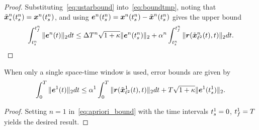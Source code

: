\begin{proof}
Substituting~\eqref{eq:ustarbound} into~\eqref{eq:boundtmp}, noting that $\tilde{\boldsymbol x}_{*}^{n}(t_s^{n})=  {\boldsymbol x}^{n}(t_s^{n})$,  and using $\boldsymbol e^{n}(t_s^{n}) =  {\boldsymbol x}^{n}(t_s^{n} ) -  \tilde{\boldsymbol x}^{n}(t_s^{n})$ gives the upper bound
\begin{equation*}
\int_{t_s^{n}}^{t_f^{n}} \| \boldsymbol e^{n}(t) \|_2 dt \le \Delta T^{n} \sqrt{1 + \kappa} \|  \boldsymbol e^{n}(t_s^{n})   \|_2   + \alpha^{n} \int_{t_s^{n}}^{t_f^{n}} \|  \boldsymbol r(\tilde{\boldsymbol x}_{\ell^2}^{n}(t),t)  \|_2 dt.
\end{equation*}
\end{proof}

\begin{corollary}
When only a single space-time window is used, error bounds are given by
\begin{equation*}
\int_0^T \| \boldsymbol e^{1}(t) \|_2 dt \le \alpha^{1} \int_0^T \| \boldsymbol r(\tilde{\boldsymbol x}_{\ell^2}^{1}(t),t) \|_2dt +
 T \sqrt{1 + \kappa} \| \boldsymbol e^{1}(t_s^{1})  \|_2 .
\end{equation*}
\end{corollary}
\begin{proof}
Setting $n=1$ in~\eqref{eq:apriori_bound} with the time intervals $t_s^{1}=0$, $t_f^{1}=T$ yields the desired result.
\end{proof}

